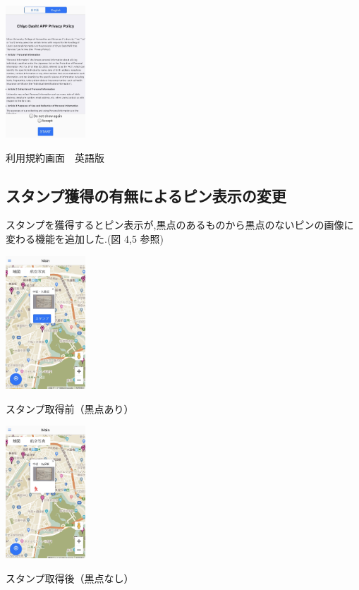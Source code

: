 \documentclass[a4paper, twoside]{jarticle}
\makeatletter
\newenvironment{figurehere}
  {\def\@captype{figure}}
  {}
\makeatother
\begin{document}
\begin{multicols}{2}
\begin{figurehere}
\begin{center}
\includegraphics[bb=30 50 550 1300,width=3cm]{./image03.jpg}%
\end{center}
\caption{利用規約画面　英語版}\label{fig:3}
\end{figurehere}


\subsection{スタンプ獲得の有無によるピン表示の変更}
スタンプを獲得するとピン表示が,黒点のあるものから黒点のないピンの画像に変わる機能を追加した.(図 4,5 参照)
\begin{figurehere}
\begin{center}
\includegraphics[bb=30 50 550 1300,width=3cm]{./image05.jpg}%
\end{center}
\caption{スタンプ取得前（黒点あり）}\label{fig:5}

\begin{center}
\includegraphics[bb=30 50 550 1300,width=3cm]{./image06.jpg}%
\end{center}
\caption{スタンプ取得後（黒点なし）}\label{fig:6}
\end{figurehere}


\end{multicols}
\end{document}
